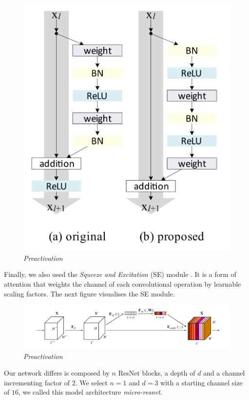 \documentclass[../document.tex]{subfiles}
\begin{document}
\begin{figure}[H]
	\centering
	\includegraphics[scale=0.2]{../img/implementation/estimator/preactivation.png}
	\caption{\emph{Preactivation}}
\end{figure}
Finally, we also used the \emph{Squeeze and Excitation} (SE) module \cite{hu2017squeeze}. It is a form of attention that weights the channel of each convolutional operation by learnable scaling factors. The next figure visualises the SE module.
\begin{figure}[H]
	\centering
	\includegraphics[width=\linewidth]{../img/implementation/estimator/se.png}
	\caption{\emph{Preactivation}}
\end{figure}
Our network differs is composed by $n$ ResNet blocks, a depth of $d$ and a channel incrementing factor of $2$. We select $n=1$ and $d=3$ with a starting channel size of $16$, we called this model architecture \emph{micro-resnet}. 
\end{document}
